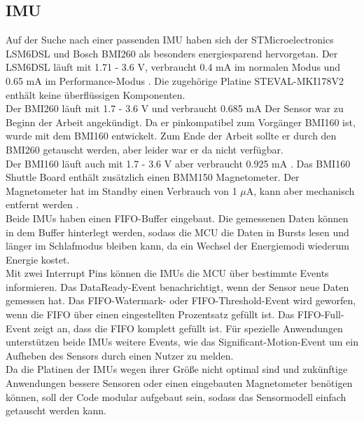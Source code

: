 \subsection{IMU}
Auf der Suche nach einer passenden IMU haben sich der STMicroelectronics LSM6DSL und Bosch BMI260 als besonders energiesparend hervorgetan.
Der LSM6DSL läuft mit 1.71 - 3.6 V, verbraucht 0.4 mA im normalen Modus und 0.65 mA im Performance-Modus \cite{datasheet_lsm6dsl}. Die zugehörige Platine STEVAL-MKI178V2 enthält keine überflüssigen Komponenten.\\
Der BMI260 läuft mit 1.7 - 3.6 V und verbraucht 0.685 mA
Der Sensor war zu Beginn der Arbeit angekündigt.
Da er pinkompatibel zum Vorgänger BMI160 ist, wurde mit dem BMI160 entwickelt.
Zum Ende der Arbeit sollte er durch den BMI260 getauscht werden, aber leider war er da nicht verfügbar. \cite{site_bmi260}\\
Der BMI160 läuft auch mit 1.7 - 3.6 V aber verbraucht 0.925 mA \cite{datasheet_bmi160}.
Das BMI160 Shuttle Board enthält zusätzlich einen BMM150 Magnetometer.
Der Magnetometer hat im Standby einen Verbrauch von 1 $\mu$A, kann aber mechanisch entfernt werden \cite{datasheet_bmm150}.\\
Beide IMUs haben einen FIFO-Buffer eingebaut.
Die gemessenen Daten können in dem Buffer hinterlegt werden, sodass die MCU die Daten in Bursts lesen und länger im Schlafmodus bleiben kann, da ein Wechsel der Energiemodi wiederum Energie kostet.\\
Mit zwei Interrupt Pins können die IMUs die MCU über bestimmte Events informieren.
Das DataReady-Event benachrichtigt, wenn der Sensor neue Daten gemessen hat.
Das FIFO-Watermark- oder FIFO-Threshold-Event wird geworfen, wenn die FIFO über einen eingestellten Prozentsatz gefüllt ist.
Das FIFO-Full-Event zeigt an, dass die FIFO komplett gefüllt ist.
Für spezielle Anwendungen unterstützen beide IMUs weitere Events, wie das Significant-Motion-Event um ein Aufheben des Sensors durch einen Nutzer zu melden.\\
Da die Platinen der IMUs wegen ihrer Größe nicht optimal sind und zukünftige Anwendungen bessere Sensoren oder einen eingebauten Magnetometer benötigen können, soll der Code modular aufgebaut sein, sodass das Sensormodell einfach getauscht werden kann.

